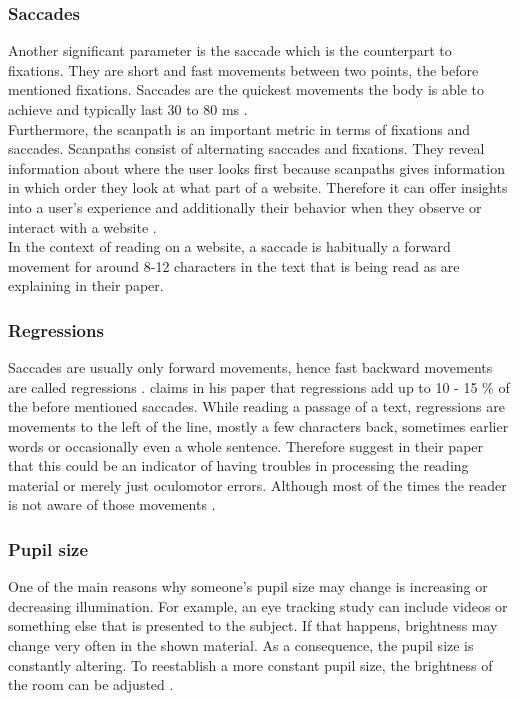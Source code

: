 \subsubsection{Saccades}
Another significant parameter is the saccade which is the counterpart to fixations. They are short and fast movements between two points, the before mentioned fixations. Saccades are the quickest movements the body is able to achieve and typically last 30 to 80 ms \autocite[]{blascheck2014state}. \\
Furthermore, the scanpath is an important metric in terms of fixations and saccades. Scanpaths consist of alternating saccades and fixations. They reveal information about where the user looks first because scanpaths gives information in which order they look at what part of a website. Therefore it can offer insights into a user's experience and additionally their behavior when they observe or interact with a website \autocite[]{lorigo2008eye, blascheck2014state}.\\
In the context of reading on a website, a saccade is habitually a forward movement for around 8-12 characters in the text that is being read as \textcite[]{beymer2007eye} are explaining in their paper.

\subsubsection{Regressions}
Saccades are usually only forward movements, hence fast backward movements are called regressions \autocite[]{reichle1998toward}. 
\textcite[]{rayner1998eye} claims in his paper that regressions add up to 10 - 15 \% of the before mentioned saccades.
While reading a passage of a text, regressions are movements to the left of the line, mostly a few characters back, sometimes earlier words or occasionally even a whole sentence. Therefore \textcite[]{kruger2014subtitles} suggest in their paper that this could be an indicator of having troubles in processing the reading material or merely just oculomotor errors. Although most of the times the reader is not aware of those movements \autocite[]{reichle2003ez, biedert2010eyebook}.

\subsubsection{Pupil size}
One of the main reasons why someone's pupil size may change is increasing or decreasing illumination. For example, an eye tracking study can include videos or something else that is presented to the subject. If that happens, brightness may change very often in the shown material. As a consequence, the pupil size is constantly altering. To reestablish a more constant pupil size, the brightness of the room can be adjusted \autocite[]{goldberg2002eye}.

